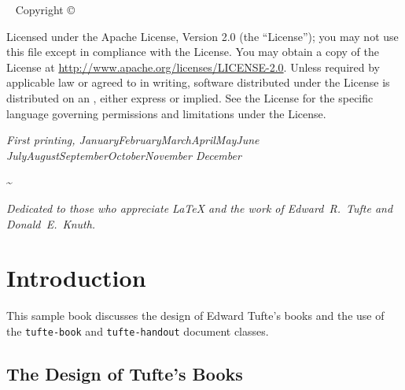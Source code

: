 \documentclass{tufte-book}
\newcommand{\monthyear}{%
  \ifcase\month\or January\or February\or March\or April\or May\or June\or
  July\or August\or September\or October\or November\or
  December\fi\space\number\year
}
\newcommand{\doccls}[1]{\texttt{#1}}%
\begin{document}
\newpage
\begin{fullwidth}
~\vfill
\thispagestyle{empty}
\setlength{\parindent}{0pt}
\setlength{\parskip}{\baselineskip}
Copyright \copyright\ \the\year\ \thanklessauthor

\par{}

\par{}

\par Licensed under the Apache License, Version 2.0 (the ``License''); you may not
use this file except in compliance with the License. You may obtain a copy
of the License at \url{http://www.apache.org/licenses/LICENSE-2.0}. Unless
required by applicable law or agreed to in writing, software distributed
under the License is distributed on an , either express or implied. See the
License for the specific language governing permissions and limitations
under the License.

\par\textit{First printing, \monthyear}
\end{fullwidth}

\tableofcontents

\listoffigures

\listoftables

\cleardoublepage

\textasciitilde{}\vfill

\begin{doublespace}
\noindent\fontsize{18}{22}\selectfont\itshape
\nohyphenation
Dedicated to those who appreciate \LaTeX{} 
and the work of \mbox{Edward R.~Tufte} 
and \mbox{Donald E.~Knuth}.
\end{doublespace}
\vfill
\vfill

\cleardoublepage
\chapter*{Introduction}

This sample book discusses the design of Edward Tufte's
books\cite{Tufte2001,Tufte1990,Tufte1997,Tufte2006} and the use of the
\doccls{tufte-book} and \doccls{tufte-handout} document classes.

\mainmatter

\section{The Design of Tufte's Books}\label{ch:tufte-design}
\end{document}
